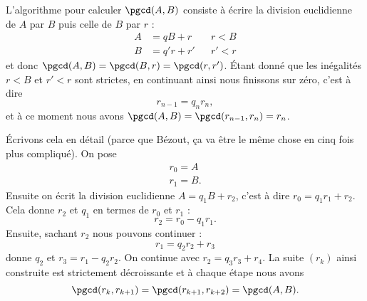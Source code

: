 L'algorithme pour calculer \( \pgcd(A,B)\) consiste à écrire la division euclidienne de \( A\) par \( B\) puis celle de \( B\) par \( r\) :
\begin{subequations}
    \begin{align}
        A&=qB+r&&r<B\\
        B&=q'r+r'&&r'<r
    \end{align}
\end{subequations}
et donc \( \pgcd(A,B)=\pgcd(B,r)=\pgcd(r,r')\). Étant donné que les inégalités \( r<B\) et \( r'<r\) sont strictes, en continuant ainsi nous finissons sur zéro, c'est à dire
\begin{equation}
    r_{n-1}=q_nr_n,
\end{equation}
et à ce moment nous avons \( \pgcd(A,B)=\pgcd(r_{n-1},r_n)=r_n\).

Écrivons cela en détail (parce que Bézout, ça va être le même chose en cinq fois plus compliqué). On pose
\begin{subequations}
    \begin{align}
        r_0=A\\
        r_1=B.
    \end{align}
\end{subequations}
Ensuite on écrit la division euclidienne \( A=q_1B+r_2\), c'est à dire \( r_0=q_1r_1+r_2\). Cela donne \( r_2\) et \( q_1\) en termes de \( r_0\) et \( r_1\) :
\begin{equation}
    r_2=r_0-q_1r_1.
\end{equation}
Ensuite, sachant \( r_2\) nous pouvons continuer :
\begin{equation}
    r_1=q_2r_2+r_3
\end{equation}
donne \( q_2\) et \( r_3=r_1-q_2r_2\). On continue avec \( r_2=q_3r_3+r_4\). La suite \( (r_k)\) ainsi construite est strictement décroissante et à chaque étape nous avons
\begin{equation}
    \pgcd(r_k,r_{k+1})=\pgcd(r_{k+1},r_{k+2})=\pgcd(A,B).
\end{equation}

